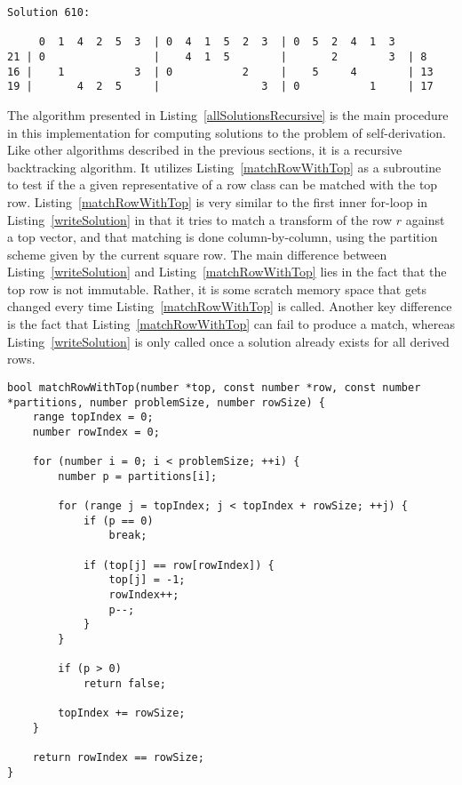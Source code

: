 \begin{lstlisting}[basicstyle=\ttfamily\footnotesize,numbers=none]
Solution 610:

     0  1  4  2  5  3  | 0  4  1  5  2  3  | 0  5  2  4  1  3  
21 | 0                 |    4  1  5        |       2        3  | 8
16 |    1           3  | 0           2     |    5     4        | 13
19 |       4  2  5     |                3  | 0           1     | 17
\end{lstlisting}

\vspace{12pt}

The algorithm presented in Listing~\ref{allSolutionsRecursive} is the main procedure in this implementation for computing solutions to the problem of self-derivation. Like other algorithms described in the previous sections, it is a recursive backtracking algorithm. It utilizes Listing~\ref{matchRowWithTop} as a subroutine to test if the a given representative of a row class can be matched with the top row. Listing~\ref{matchRowWithTop} is very similar to the first inner for-loop in Listing~\ref{writeSolution} in that it tries to match a transform of the row $r$ against a top vector, and that matching is done column-by-column, using the partition scheme given by the current square row. The main difference between Listing~\ref{writeSolution} and Listing~\ref{matchRowWithTop} lies in the fact that the top row is not immutable. Rather, it is some scratch memory space that gets changed every time Listing~\ref{matchRowWithTop} is called. Another key difference is the fact that Listing~\ref{matchRowWithTop} can fail to produce a match, whereas Listing~\ref{writeSolution} is only called once a solution already exists for all derived rows.

\begin{lstlisting}[caption={Matching a representative of a row class with a given top vector.},label={matchRowWithTop}]
bool matchRowWithTop(number *top, const number *row, const number *partitions, number problemSize, number rowSize) {
    range topIndex = 0;
    number rowIndex = 0;

    for (number i = 0; i < problemSize; ++i) {
        number p = partitions[i];

        for (range j = topIndex; j < topIndex + rowSize; ++j) {
            if (p == 0)
                break;

            if (top[j] == row[rowIndex]) {
                top[j] = -1;
                rowIndex++;
                p--;
            }
        }

        if (p > 0)
            return false;

        topIndex += rowSize;
    }

    return rowIndex == rowSize;
}
\end{lstlisting}

